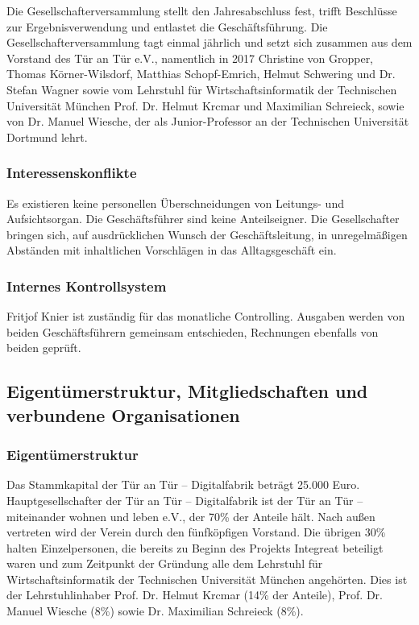 \documentclass[12pt, a4paper]{article} %
\begin{document}
Die Gesellschafterversammlung stellt den Jahresabschluss fest, trifft
Beschlüsse zur Ergebnisverwendung und entlastet die Geschäftsführung.
Die Gesellschafterversammlung tagt einmal jährlich und setzt sich
zusammen aus dem Vorstand des Tür an Tür e.V., namentlich in 2017
Christine von Gropper, Thomas Körner-Wilsdorf, Matthias Schopf-Emrich,
Helmut Schwering und Dr. Stefan Wagner sowie vom Lehrstuhl für
Wirtschaftsinformatik der Technischen Universität München Prof. Dr.
Helmut Krcmar und Maximilian Schreieck, sowie von Dr. Manuel Wiesche,
der als Junior-Professor an der Technischen Universität Dortmund lehrt.

\hypertarget{interessenskonflikte}{%
\subsubsection{Interessenskonflikte}\label{interessenskonflikte}}

Es existieren keine personellen Überschneidungen von Leitungs- und
Aufsichtsorgan. Die Geschäftsführer sind keine Anteilseigner. Die
Gesellschafter bringen sich, auf ausdrücklichen Wunsch der
Geschäftsleitung, in unregelmäßigen Abständen mit inhaltlichen
Vorschlägen in das Alltagsgeschäft ein.

\hypertarget{internes-kontrollsystem}{%
\subsubsection{Internes
Kontrollsystem}\label{internes-kontrollsystem}}

Fritjof Knier ist zuständig für das monatliche Controlling. Ausgaben
werden von beiden Geschäftsführern gemeinsam entschieden, Rechnungen
ebenfalls von beiden geprüft.

\hypertarget{eigentuxfcmerstruktur-mitgliedschaften-und-verbundene-organisationen}{%
\subsection{Eigentümerstruktur, Mitgliedschaften und verbundene
Organisationen}\label{eigentuxfcmerstruktur-mitgliedschaften-und-verbundene-organisationen}}

\hypertarget{eigentuxfcmerstruktur}{%
\subsubsection{Eigentümerstruktur}\label{eigentuxfcmerstruktur}}

Das Stammkapital der Tür an Tür – Digitalfabrik beträgt 25.000 Euro.
Hauptgesellschafter der Tür an Tür – Digitalfabrik ist der Tür an Tür –
miteinander wohnen und leben e.V., der 70\% der Anteile hält. Nach außen
vertreten wird der Verein durch den fünfköpfigen Vorstand. Die übrigen
30\% halten Einzelpersonen, die bereits zu Beginn des Projekts Integreat
beteiligt waren und zum Zeitpunkt der Gründung alle dem Lehrstuhl für
Wirtschaftsinformatik der Technischen Universität München angehörten.
Dies ist der Lehrstuhlinhaber Prof. Dr. Helmut Krcmar (14\% der
Anteile), Prof. Dr. Manuel Wiesche (8\%) sowie Dr. Maximilian Schreieck
(8\%).
\end{document}
